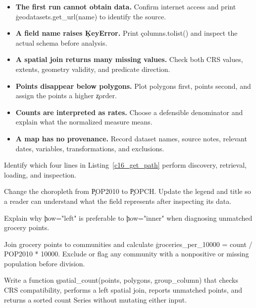 
\begin{itemize}
    \item \textbf{The first run cannot obtain data.} Confirm internet access and
          print \c{geodatasets.get_url(name)} to identify the source.
    \item \textbf{A field name raises \c{KeyError}.} Print \c{columns.tolist()}
          and inspect the actual schema before analysis.
    \item \textbf{A spatial join returns many missing values.} Check both CRS
          values, extents, geometry validity, and predicate direction.
    \item \textbf{Points disappear below polygons.} Plot polygons first, points
          second, and assign the points a higher \c{zorder}.
    \item \textbf{Counts are interpreted as rates.} Choose a defensible
          denominator and explain what the normalized measure means.
    \item \textbf{A map has no provenance.} Record dataset names, source notes,
          relevant dates, variables, transformations, and exclusions.
\end{itemize}



Identify which four lines in Listing~\ref{c16_get_path} perform discovery,
retrieval, loading, and inspection.


Change the choropleth from \c{POP2010} to \c{POPCH}. Update the legend and title
so a reader can understand what the field represents after inspecting its data.


Explain why \c{how="left"} is preferable to \c{how="inner"} when diagnosing
unmatched grocery points.


Join grocery points to communities and calculate
\c{groceries_per_10000 = count / POP2010 * 10000}. Exclude or flag any community
with a nonpositive or missing population before division.


Write a function \c{spatial_count(points, polygons, group_column)} that checks
CRS compatibility, performs a left spatial join, reports unmatched points, and
returns a sorted count Series without mutating either input.

